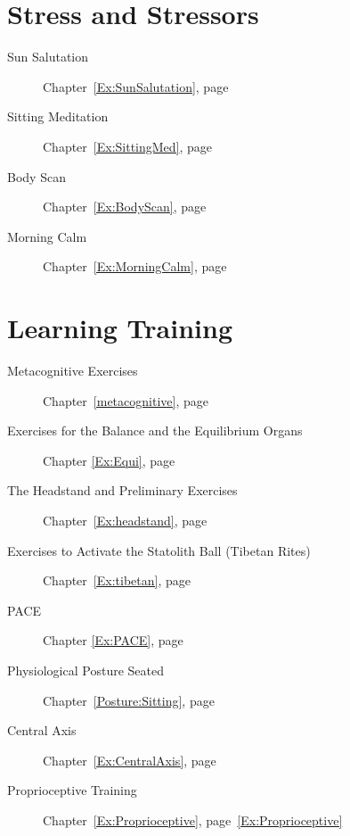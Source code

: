 \documentclass[../main.tex]{subfiles}
\begin{document}
%
\section{Stress and Stressors}

\begin{description}
\item[Sun Salutation] Chapter~\ref{Ex:SunSalutation}, page~\pageref{Ex:SunSalutation}
\item[Sitting Meditation] Chapter~\ref{Ex:SittingMed}, page~\pageref{Ex:SittingMed}
  \item[Body Scan] Chapter~\ref{Ex:BodyScan}, page~\pageref{Ex:BodyScan}
  \item[Morning Calm] Chapter~\ref{Ex:MorningCalm}, page~\pageref{Ex:MorningCalm}
  \end{description}

\section{Learning Training}
\begin{description} 
\item[Metacognitive Exercises] Chapter~\ref{metacognitive}, page~\pageref{metacognitive}
\item[Exercises for the Balance and the Equilibrium Organs] Chapter \ref{Ex:Equi}, page~\pageref{Ex:Equi}
\item[The Headstand and Preliminary Exercises] Chapter~\ref{Ex:headstand}, page~\pageref{Ex:headstand}
\item[Exercises to Activate the Statolith Ball (Tibetan Rites)] Chapter~\ref{Ex:tibetan}, page~\pageref{Ex:tibetan}
\item[PACE] Chapter \ref{Ex:PACE}, page \pageref{Ex:PACE}
\item[Physiological Posture Seated] Chapter~\ref{Posture:Sitting}, page~\pageref{Posture:Sitting}
\item[Central Axis] Chapter~\ref{Ex:CentralAxis}, page~\pageref{Ex:CentralAxis}
\item[Proprioceptive Training] Chapter~\ref{Ex:Proprioceptive}, page~\ref{Ex:Proprioceptive}
\end{description}
\end{document}
